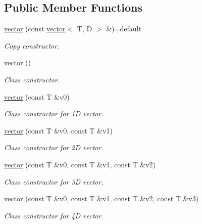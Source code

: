 \subsection*{Public Member Functions}
\begin{DoxyCompactItemize}
\item 
\mbox{\label{classacme_1_1vector_af09f833651a9ddf597327a6a75a306df}} 
\hyperlink{classacme_1_1vector_af09f833651a9ddf597327a6a75a306df}{vector} (const \hyperlink{classacme_1_1vector}{vector}$<$ T, D $>$ \&)=default
\begin{DoxyCompactList}\small\item\em Copy constructor. \end{DoxyCompactList}\item 
\mbox{\label{classacme_1_1vector_a19de30dca513ad892825f0e49b9eb0c9}} 
\hyperlink{classacme_1_1vector_a19de30dca513ad892825f0e49b9eb0c9}{vector} ()
\begin{DoxyCompactList}\small\item\em Class constructor. \end{DoxyCompactList}\item 
\hyperlink{classacme_1_1vector_aa29b7e609acdb3ed9485a3c8864f2b5c}{vector} (const T \&v0)
\begin{DoxyCompactList}\small\item\em Class constructor for 1D vector. \end{DoxyCompactList}\item 
\hyperlink{classacme_1_1vector_a8ff8e02ac02848f92e7c8d04e6e24e85}{vector} (const T \&v0, const T \&v1)
\begin{DoxyCompactList}\small\item\em Class constructor for 2D vector. \end{DoxyCompactList}\item 
\hyperlink{classacme_1_1vector_ae5a62d7c7bb2c843014935db07c65e63}{vector} (const T \&v0, const T \&v1, const T \&v2)
\begin{DoxyCompactList}\small\item\em Class constructor for 3D vector. \end{DoxyCompactList}\item 
\hyperlink{classacme_1_1vector_a8027e03714eaada465122081b75e8d86}{vector} (const T \&v0, const T \&v1, const T \&v2, const T \&v3)
\begin{DoxyCompactList}\small\item\em Class constructor for 4D vector. \end{DoxyCompactList}\item 

\end{DoxyCompactItemize}

